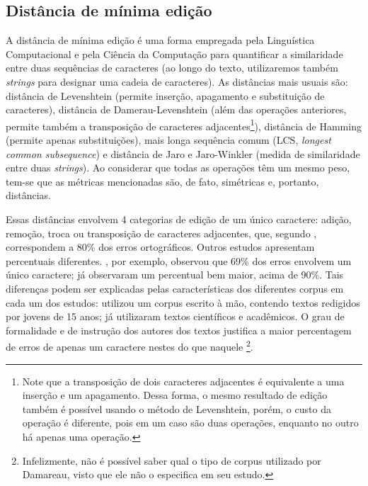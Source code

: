 \documentclass{textolivre}
\begin{document}
\subsection{Distância de mínima edição}\label{sec-min-edit}
A distância de mínima edição é uma forma empregada pela Linguística Computacional e pela Ciência da Computação para
quantificar
a similaridade entre duas sequências de caracteres (ao longo do texto, utilizaremos também \textit{strings} para designar uma cadeia de caracteres). 
As distâncias mais usuais são: distância de Levenshtein (permite inserção, apagamento e substituição de caracteres),
distância de Damerau-Levenshtein (além das operações anteriores, permite também a transposição de caracteres adjacentes\footnote{
Note que a transposição de dois caracteres adjacentes é equivalente a uma inserção e um apagamento. Dessa forma,
o mesmo resultado de edição também é possível usando o método de Levenshtein, porém, o custo da operação é diferente,
pois em um caso são duas operações, enquanto no outro há apenas uma operação. }), distância de Hamming (permite
apenas substituições), mais longa sequência comum (LCS, \textit{longest common subsequence}) e
distância de Jaro e Jaro-Winkler
(medida de similaridade entre duas 
\textit{strings}). Ao
considerar que todas as operações têm um mesmo peso, tem-se que as métricas
mencionadas são, de fato, simétricas e, portanto, distâncias.

Essas distâncias envolvem 4 categorias
de edição de um único caractere: 
adição, remoção, troca ou transposição
de caracteres adjacentes, que, segundo \textcite{damerau1964}, correspondem
a 80\% dos erros ortográficos.
Outros estudos apresentam percentuais diferentes. \textcite{mitton1987}, por
exemplo, observou que 69\% dos erros
envolvem
um único caractere; já \textcite{pollock1984} %
observaram um percentual bem maior, acima de 90\%. %
Tais diferenças podem ser explicadas
pelas características dos diferentes corpus em cada um dos estudos:
\textcite{mitton1987} utilizou um corpus escrito à mão, contendo textos redigidos por jovens de 15 anos;
já \textcite{pollock1984} utilizaram textos científicos e acadêmicos. O grau de
formalidade e de instrução dos autores
dos textos justifica a maior percentagem
de erros de apenas um caractere nestes
do que naquele \footnote{ Infelizmente,
não é possível saber qual o tipo
de corpus utilizado por Damareau, visto
que ele não o especifica em seu
estudo.}.
\end{document}
